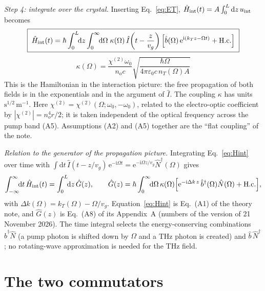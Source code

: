 \documentclass[aps,pra,onecolumn,notitlepage,11pt,amsmath,amssymb,nofootinbib]{revtex4-2}
\newcommand{\Nop}{\hat N}
\newcommand{\Iop}{\hat I}
\newcommand{\dd}{\mathrm{d}}
\newcommand{\ee}{\mathrm{e}}
\newcommand{\ii}{\mathrm{i}}
\begin{document}
\emph{Step 4: integrate over the crystal.} Inserting Eq.~\eqref{eq:ET},
$\hat H_{\rm int}(t)=A\int_0^L\dd z\,u_{\rm int}$ becomes
\begin{equation}
\boxed{\;
\hat H_{\rm int}(t)=\hbar\int_0^L\!\!\dd z\int_0^\infty\!\!\dd\Omega\;
\kappa(\Omega)\,\Iop\!\left(t-\frac{z}{v_g}\right)
\Big[\hat b(\Omega)\,\ee^{\ii(k_Tz-\Omega t)}+\mathrm{H.c.}\Big]\;}
\label{eq:Hint}
\end{equation}
\begin{equation}
\boxed{\;\kappa(\Omega)=\frac{\chi^{(2)}\omega_0}{n_oc}
\sqrt{\frac{\hbar\Omega}{4\pi\varepsilon_0c\,n_T(\Omega)A}}\;}
\label{eq:kappa}
\end{equation}
This is the Hamiltonian in the interaction picture: the free propagation of
both fields is in the exponentials and in the argument of $\Iop$. The coupling
$\kappa$ has units $\mathrm{s}^{1/2}\,\mathrm{m}^{-1}$. Here
$\chi^{(2)}=\chi^{(2)}(\Omega;\omega_0,-\omega_0)$, related to the
electro-optic coefficient by $|\chi^{(2)}|=n_o^4r/2$; it is taken independent
of the optical frequency across the pump band (A5). Assumptions (A2) and (A5)
together are the ``flat coupling'' of the note.

\emph{Relation to the generator of the propagation picture.} Integrating
Eq.~\eqref{eq:Hint} over time with
$\int\dd t\,\Iop(t-z/v_g)\,\ee^{-\ii\Omega t}
=\ee^{-\ii\Omega z/v_g}\Nop^\dagger(\Omega)$ gives
\begin{equation}
\int_{-\infty}^{\infty}\!\!\dd t\,\hat H_{\rm int}(t)=\int_0^L\!\!\dd z\,\hat G(z),
\qquad
\hat G(z)=\hbar\int_0^\infty\!\!\dd\Omega\,\kappa(\Omega)
\Big[\ee^{-\ii\Delta k\,z}\,\hat b^\dagger(\Omega)\Nop(\Omega)+\mathrm{H.c.}\Big],
\label{eq:G}
\end{equation}
with $\Delta k(\Omega)=k_T(\Omega)-\Omega/v_g$. Equation~\eqref{eq:Hint} is
Eq.~(A1) of the theory note, and $\hat G(z)$ is Eq.~(A8) of its Appendix~A
(numbers of the version of 21 November 2026). The time integral selects the energy-conserving combinations
$\hat b^\dagger\Nop$ (a pump photon is shifted down by $\Omega$ and a THz
photon is created) and $\hat b\,\Nop^\dagger$; no rotating-wave approximation
is needed for the THz field.

\section{The two commutators}
\end{document}
